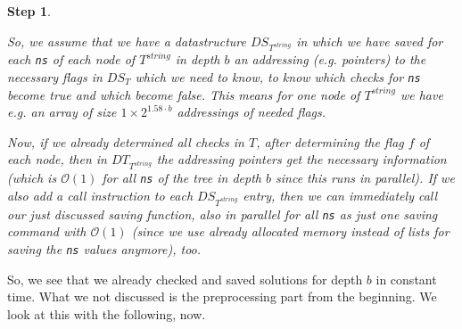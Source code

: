 \documentclass{article}
\newtheorem*{theorem A}{Theorem A}
\newtheorem*{theorem B}{N\"olker's Theorem}
\newtheorem{step}{Step}
\theoremstyle{remark}
\theoremstyle{remark}
\begin{document}
\begin{step}
\begin{enumerate}
        So, we assume that we have a datastructure $DS_{T^{string}}$ in which we have saved for each \texttt{ns} of each node of $T^{string}$ in depth $b$ an addressing (e.g. pointers) to the necessary flags in $DS_{T}$ which we need to know, to know which checks for \texttt{ns} become true and which become false. This means for one node of $T^{string}$ we have e.g. an array of size $1 \times 2^{1.58 \cdot b}$ addressings of needed flags.
    \end{enumerate}

    Now, if we already determined all checks in $T$, after determining the flag $f$ of each node, then in $DT_{T^{string}}$ the addressing pointers get the necessary information (which is $\mathcal{O}\left(1\right)$ for all \texttt{ns} of the tree in depth $b$ since this runs in parallel). If we also add a call instruction to each $DS_{T^{string}}$ entry, then we can immediately call our just discussed saving function, also in parallel for all \texttt{ns} as just one saving command with $\mathcal{O}\left(1\right)$ (since we use already allocated memory instead of lists for saving the \texttt{ns} values anymore), too.

\label{step:treeT_checks}
\end{step}

So, we see that we already checked and saved solutions for depth $b$ in constant time. What we not discussed is the preprocessing part from the beginning. We look at this with the following, now.
\end{document}

